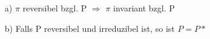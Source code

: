 \mbox{}
\begin{itemize}
\item[a)]  $\pi$ reversibel bzgl. P $\Rightarrow$ $\pi$ invariant bzgl. P
\item[b)] Falls P reversibel und irreduzibel ist, so ist $P = P*$
\end{itemize}